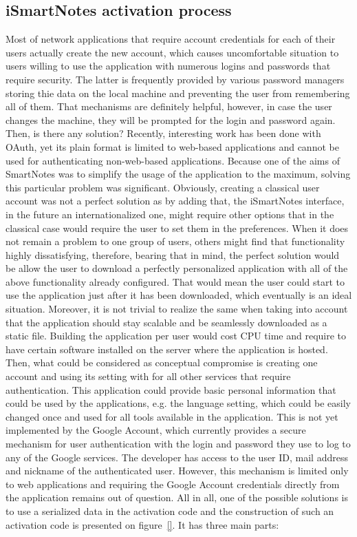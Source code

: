 \subsection{iSmartNotes activation process}\label{subsec:ismartnotes_activation}
Most of network applications that require account credentials for each of their users actually create the new account, which causes uncomfortable situation to users willing to use the application with numerous logins and passwords that require security. The latter is frequently provided by various password managers storing thie data on the local machine and preventing the user from remembering all of them. That mechanisms are definitely helpful, however, in case the user changes the machine, they will be prompted for the login and password again. Then, is there any solution? Recently, interesting work has been done with OAuth, yet its plain format is limited to web-based applications and cannot be used for authenticating non-web-based applications. Because one of the aims of SmartNotes was to simplify the usage of the application to the maximum, solving this particular problem was significant. Obviously, creating a classical user account was not a perfect solution as by adding that, the iSmartNotes interface, in the future an internationalized one, might require other options that in the classical case would require the user to set them in the preferences. When it does not remain a problem to one group of users, others might find that functionality highly dissatisfying, therefore, bearing that in mind, the perfect solution would be allow the user to download a perfectly personalized application with all of the above functionality already configured. That would mean the user could start to use the application just after it has been downloaded, which eventually is an ideal situation. Moreover, it is not trivial to realize the same when taking into account that the application should stay scalable and be seamlessly downloaded as a static file. Building the application per user would cost CPU time and require to have certain software installed on the server where the application is hosted. Then, what could be considered as conceptual compromise is creating one account and using its setting with for all other services that require authentication. This application could provide basic personal information that could be used by the applications, e.g. the language setting, which could be easily changed once and used for all tools available in the application. This is not yet implemented by the Google Account, which currently provides a secure mechanism for user authentication with the login and password they use to log to any of the Google services. The developer has access to the user ID, mail address and nickname of the authenticated user. However, this mechanism is limited only to web applications and requiring the Google Account credentials directly from the application remains out of question. All in all, one of the possible solutions is to use a serialized data in the activation code and the construction of such an activation code is presented on figure~\ref{}. It has three main parts:
